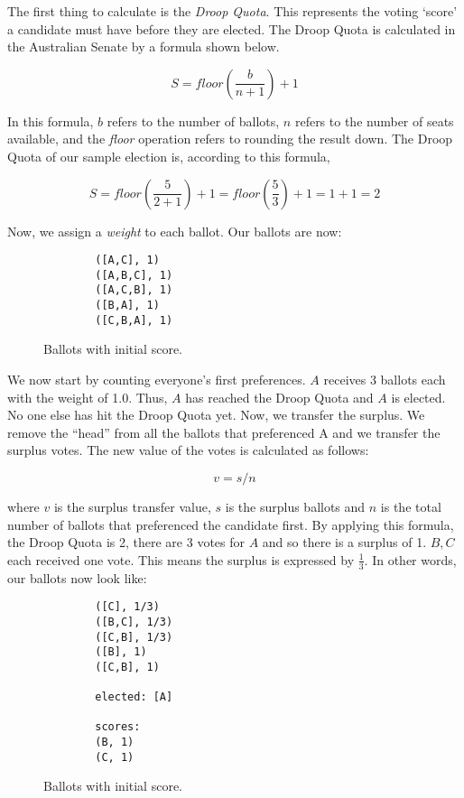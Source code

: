 The first thing to calculate is the \textit{Droop Quota}. This represents the voting `score' a candidate must have before they are elected. The Droop Quota is calculated in the Australian Senate by a formula shown below. 

$$
S = floor(\frac{b}{n + 1}) + 1
$$

In this formula, $b$ refers to the number of ballots, $n$ refers to the number
of seats available, and the \textit{floor} operation refers to rounding the
result down. The Droop Quota of our sample election is, according to this formula, 

$$
S = floor(\frac{5}{2 + 1}) + 1 = floor(\frac{5}{3}) + 1 = 1 + 1 = 2
$$

Now, we assign a \textit{weight} to each ballot. Our ballots are now: 

\begin{figure}[ht!!!!!!!!]
    \caption{Ballots with initial score.}
    \label{sample_election2}
    \begin{lstlisting}
        ([A,C], 1)
        ([A,B,C], 1)
        ([A,C,B], 1)
        ([B,A], 1)
        ([C,B,A], 1)
    \end{lstlisting}
\end{figure}

We now start by counting everyone's first preferences. $A$ receives 3 ballots
each with the weight of 1.0. Thus, $A$ has reached the Droop Quota and $A$ is
elected. No one else has hit the Droop Quota yet. Now, we transfer the surplus.
We remove the ``head'' from all the ballots that preferenced A and we transfer
the surplus votes. The new value of the votes is calculated as follows: 

$$
v = s/n
$$

where $v$ is the surplus transfer value, $s$ is the surplus ballots and $n$ is
the total number of ballots that preferenced the candidate first. By applying
this formula, the Droop Quota is 2, there are 3 votes for $A$ and so there is a
surplus of 1. $B, C$ each received one vote. This means the surplus is expressed
by $\frac{1}{3}$. In other words, our ballots now look like: 

\begin{figure}[ht!!!!!!!!]
    \caption{Ballots with initial score.}
    \label{sample_election2}
    \begin{lstlisting}
        ([C], 1/3)
        ([B,C], 1/3)
        ([C,B], 1/3)
        ([B], 1)
        ([C,B], 1)
        
        elected: [A]
        
        scores: 
        (B, 1)
        (C, 1)
    \end{lstlisting}
\end{figure}


